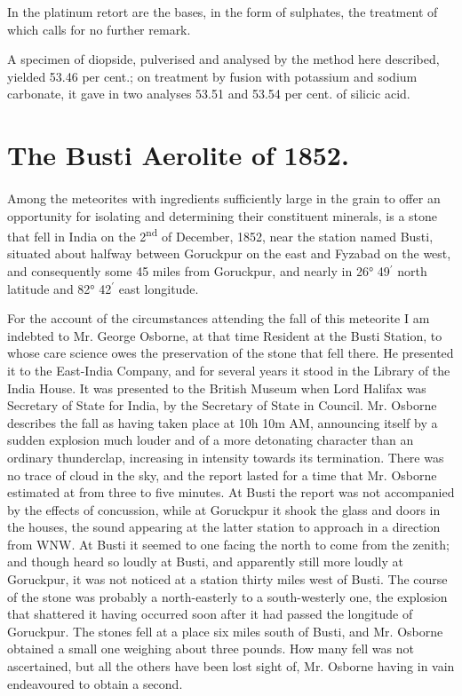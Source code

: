 \documentclass[a4paper, 12pt, oneside]{article}
\begin{document}
In the platinum retort are the bases, in the form of sulphates, the treatment of which calls for no further remark.

A specimen of diopside, pulverised and analysed by the method here described, yielded 53.46 per cent.; on treatment by fusion with potassium and sodium carbonate, it gave in two analyses 53.51 and 53.54 per cent. of silicic acid.
\clearpage
\section{The Busti Aerolite of 1852.}
\paragraph{}
Among the meteorites with ingredients sufficiently large in the grain to offer an opportunity for isolating and determining their constituent minerals, is a stone that fell in India on the 2\textsuperscript{nd} of December, 1852, near the station named Busti, situated about halfway between Goruckpur on the east and Fyzabad on the west, and consequently some 45 miles from Goruckpur, and nearly in 26° 49$^{\prime}$ north latitude and 82° 42$^{\prime}$ east longitude.

For the account of the circumstances attending the fall of this meteorite I am indebted to Mr. George Osborne, at that time Resident at the Busti Station, to whose care science owes the preservation of the stone that fell there. He presented it to the East-India Company, and for several years it stood in the Library of the India House. It was presented to the British Museum when Lord Halifax was Secretary of State for India, by the Secretary of State in Council. Mr. Osborne describes the fall as having taken place at 10h 10m AM, announcing itself by a sudden explosion much louder and of a more detonating character than an ordinary thunderclap, increasing in intensity towards its termination. There was no trace of cloud in the sky, and the report lasted for a time that Mr. Osborne estimated at from three to five minutes. At Busti the report was not accompanied by the effects of concussion, while at Goruckpur it shook the glass and doors in the houses, the sound appearing at the latter station to approach in a direction from WNW. At Busti it seemed to one facing the north to come from the zenith; and though heard so loudly at Busti, and apparently still more loudly at Goruckpur, it was not noticed at a station thirty miles west of Busti. The course of the stone was probably a north-easterly to a south-westerly one, the explosion that shattered it having occurred soon after it had passed the longitude of Goruckpur. The stones fell at a place six miles south of Busti, and Mr. Osborne obtained a small one weighing about three pounds. How many fell was not ascertained, but all the others have been lost sight of, Mr. Osborne having in vain endeavoured to obtain a second.
\end{document}
